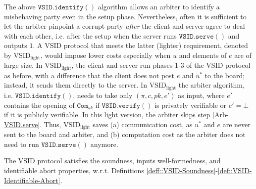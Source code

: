 \begin{remark}\label{remark::light-VSID}
The above  $\mathtt{VSID.identify}()$ algorithm   allows an arbiter  to identify a misbehaving party even in the setup phase. Nevertheless, often it is sufficient  to let the arbiter pinpoint a corrupt party \emph{after} the client and server agree to deal with each other, i.e. after the setup when the server runs  $\mathtt{VSID.serve}()$ and outputs $1$. A VSID protocol that meets the latter (lighter) requirement, denoted by $\text{VSID}_{\scriptscriptstyle \text{light}}$, would impose lower costs  especially when $u$ and elements of $e$ are of large size. In  $\text{VSID}_{\scriptscriptstyle \text{light}}$, the client and server  run phases 1-3 of the VSID protocol as before, with a difference that the client does not post $e$ and $u^{\scriptscriptstyle*}$ to the board; instead, it sends them directly to the server. In $\text{VSID}_{\scriptscriptstyle\text{light}}$  the arbiter algorithm, i.e. $\mathtt{VSID.identify}()$, needs to take only $(\pi, c, pk, e')$ as input, where $e'$ contains the opening of $\mathtt{Com}_{\scriptscriptstyle {sk}}$ if $\mathtt{VSID.verify}()$ is privately verifiable or $e'=\bot$ if  it is publicly verifiable. In this light version, the arbiter   skips step \ref{Arb-VSID.serve}. Thus, $\text{VSID}_{\scriptscriptstyle\text{light}}$ saves (a)  communication cost, as   $u^{\scriptscriptstyle*}$ and $e$ are never sent to the board and  arbiter, and (b) computation  cost as the arbiter does not need to run $\mathtt{VSID.serve}()$ anymore.
\end{remark}


\begin{theorem}
The VSID protocol satisfies the soundness, inputs well-formedness, and identifiable abort properties, w.r.t. Definitions \ref{deff::VSID-Soundness}-\ref{def::VSID-Identifiable-Abort}.
\end{theorem}













